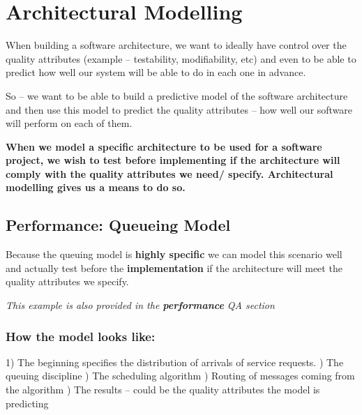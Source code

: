 \documentclass[a4paper]{article}
\begin{document}
\newpage
\section{Architectural Modelling}
When building a software architecture, we want to ideally have control over the quality attributes (example – testability, modifiability, etc) and even to be able to predict how well our system will be able to do in each one in advance. 

So – we want to be able to build a predictive model of the software architecture and then use this model to predict the quality attributes – how well our software will perform on each of them.

\textbf{When we model a specific architecture to be used for a software project, we wish to test before implementing if the architecture will comply with the quality attributes we need/ specify. Architectural modelling gives us a means to do so.}

\subsection{Performance: Queueing Model}
Because the queuing model is \textbf{highly specific} we can model this scenario well and actually test before the \textbf{implementation} if the architecture will meet the quality attributes we specify. 

\textit{This example is also provided in the \textbf{performance} QA section}
\subsubsection{How the model looks like:}
1)  The beginning specifies the distribution of arrivals of service requests. )  The queuing discipline )  The scheduling algorithm  )  Routing of messages coming from the algorithm  )  The results – could be the quality attributes the model is predicting \newline
\end{document}

